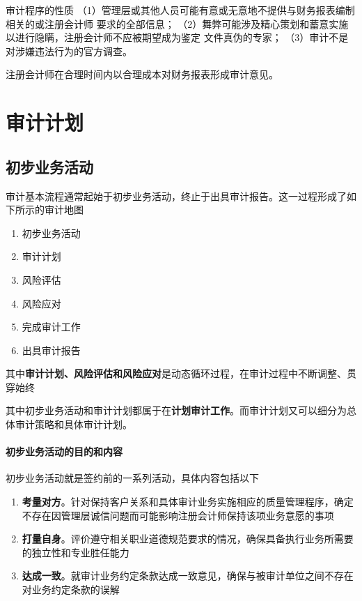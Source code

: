 \documentclass[UTF8,12pt]{ctexart}
\numberwithin{equation}{section} %
\numberwithin{figure}{section}
\numberwithin{table}{section}
\begin{document}
	审计程序的性质
	（1）管理层或其他人员可能有意或无意地不提供与财务报表编制相关的或注册会计师
	要求的全部信息；
	（2）舞弊可能涉及精心策划和蓄意实施以进行隐瞒，注册会计师不应被期望成为鉴定
	文件真伪的专家；
	（3）审计不是对涉嫌违法行为的官方调查。
	
	
	注册会计师在合理时间内以合理成本对财务报表形成审计意见。
	
	\newpage
	\section{审计计划}
	\subsection{初步业务活动}
	审计基本流程通常起始于初步业务活动，终止于出具审计报告。这一过程形成了如下所示的审计地图
	
	\begin{enumerate}
		\item 初步业务活动
		
		\item 审计计划
		
		\item 风险评估
		
		\item 风险应对
		
		\item 完成审计工作
		
		\item 出具审计报告
	\end{enumerate}
	
	其中\textbf{审计计划、风险评估和风险应对}是动态循环过程，在审计过程中不断调整、贯穿始终
	
	其中初步业务活动和审计计划都属于在\textbf{计划审计工作}。而审计计划又可以细分为总体审计策略和具体审计计划。
	
	\paragraph{初步业务活动的目的和内容}
	初步业务活动就是签约前的一系列活动，具体内容包括以下
	\begin{enumerate}
		\item \textbf{考量对方}。针对保持客户关系和具体审计业务实施相应的质量管理程序，确定不存在因管理层诚信问题而可能影响注册会计师保持该项业务意愿的事项
		
		\item \textbf{打量自身}。评价遵守相关职业道德规范要求的情况，确保具备执行业务所需要的独立性和专业胜任能力
		
		\item \textbf{达成一致}。就审计业务约定条款达成一致意见，确保与被审计单位之间不存在对业务约定条款的误解
	\end{enumerate}
	
\end{document}

